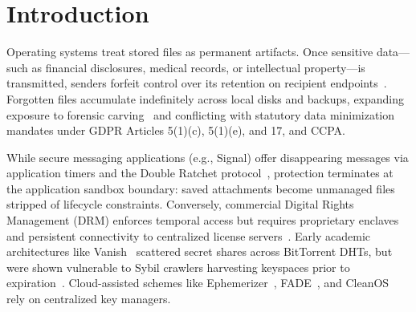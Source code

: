 \section{Introduction}
\label{sec:intro}

Operating systems treat stored files as permanent artifacts. Once sensitive data—such as financial disclosures, medical records, or intellectual property—is transmitted, senders forfeit control over its retention on recipient endpoints~\cite{diesburg2010survey}. Forgotten files accumulate indefinitely across local disks and backups, expanding exposure to forensic carving~\cite{garfinkel2010} and conflicting with statutory data minimization mandates under GDPR Articles 5(1)(c), 5(1)(e), and 17, and CCPA.

While secure messaging applications (e.g., Signal) offer disappearing messages via application timers and the Double Ratchet protocol~\cite{perrin2016doubleratchet}, protection terminates at the application sandbox boundary: saved attachments become unmanaged files stripped of lifecycle constraints. Conversely, commercial Digital Rights Management (DRM) enforces temporal access but requires proprietary enclaves and persistent connectivity to centralized license servers~\cite{armtrustzone}. Early academic architectures like Vanish~\cite{geambasu2009vanish} scattered secret shares across BitTorrent DHTs, but were shown vulnerable to Sybil crawlers harvesting keyspaces prior to expiration~\cite{wolchok2010defeating}. Cloud-assisted schemes like Ephemerizer~\cite{perlman2005ephemerizer}, FADE~\cite{tang2010fade}, and CleanOS~\cite{tang2012cleanos} rely on centralized key managers.

